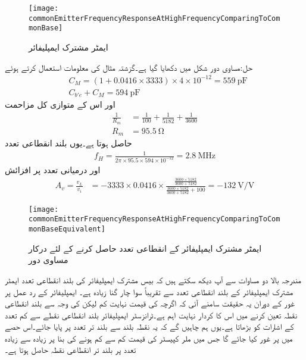 \begin{figure}
\centering
\texttt{[image: commonEmitterFrequencyResponseAtHighFrequencyComparingToCommonBase]}
\caption{ایمٹر        مشترک ایمپلیفائر}
\label{شکل_تعددی_ردعمل_مخارج_مشترک_ایمپلیفائر_اور_قابو_مشترک_موازنہ}
\end{figure}

حل:مساوی دور شکل  میں دکھایا گیا ہے۔گزشتہ مثال کی معلومات استعمال کرتے ہوئے
\begin{align*}
&C_M=\left(1+0.0416 \times  3333\right) \times 4 \times 10^{-12}=\SI{559}{\pico \farad}\\
&C_{b'e}+C_M=\SI{594}{\pico \farad}
\end{align*}
اور اس کے متوازی کل مزاحمت 
\begin{align*}
\frac{1}{R_m}&=\frac{1}{100}+\frac{1}{5182}+\frac{1}{3600}\\
R_m&=\SI{95.5}{\ohm}
\end{align*}
حاصل ہوتا ہے۔یوں بلند انقطاعی تعدد
\begin{align*}
f_H=\frac{1}{2 \pi \times 95.5 \times 594 \times 10^{-12}}=\SI{2.8}{\mega \hertz}
\end{align*}
اور درمیانی تعدد پر افزائش
\begin{align*}
A_v=\frac{v_L}{v_i}&=-3333 \times 0.0416 \times \frac{\frac{3600 \times 5182}{3600+5182}}{\frac{3600 \times 5182}{3600+5182}+100} 
=\SI{-132}{\volt \per \volt}
\end{align*}
%
\begin{figure}
\centering
\texttt{[image: commonEmitterFrequencyResponseAtHighFrequencyComparingToCommonBaseEquivalent]}
\caption{ایمٹر        مشترک ایمپلیفائر کے انقطاعی تعدد حاصل کرنے کے لئے درکار مساوی دور}
\label{شکل_تعددی_ردعمل_مخارج_مشترک_ایمپلیفائر_اور_قابو_مشترک_موازنہ_مساوی}
\end{figure}
%

مندرجہ بالا دو مساوات سے آپ دیکھ سکتے ہیں کہ بیس  مشترک ایمپلیفائر کی بلند انقطاعی تعدد ایمٹر        مشترک ایمپلیفائر کے بلند انقطاعی تعدد سے تقریباً سوا چار گنا زیادہ ہے۔
ایمپلیفائر کے  رد عمل پر غور کے دوران یہ حقیقت سامنے آئی کہ اگرچہ  کی قیمت نہایت کم لیکن  کی وجہ سے بلند انقطاعی نقطہ تعین کرنے میں اس کا کردار نہایت اہم ہے۔ٹرانزسٹر ایمپلیفائر بلند انقطاعی نقطے سے کم تعدد کے اشارات کو بڑھاتا ہے۔یوں ہم چاہیں گے کہ یہ نقطہ بلند سے بلند تر تعدد پر پایا جائے۔اس حصے میں  پر غور کیا جائے گا جس میں ملر کپیسٹر کی قیمت کم سے کم ہونے کی بنا پر زیادہ سے زیادہ تعدد پر بلند تر انقطاعی نقطہ حاصل ہوتا ہے۔

